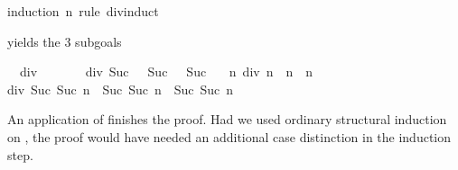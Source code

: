 \begin{isabellebody}
%
\isadelimproof
%
\endisadelimproof
%
\isatagproof
{}\isamarkupfalse%
{}induction\ n\ rule{}\ div{}{}induct{}%
\begin{isamarkuptxt}%
yields the 3 subgoals
\begin{isabelle}%
\ {}{}\ div{}\ {}{}\ {}\ {}{}\ {}\ {}\isanewline
\ {}{}\ div{}\ {}Suc\ {}\ {}\ Suc\ {}{}\ {}\ Suc\ {}\isanewline
\ {}{}\ {}n{}\ div{}\ {}n\ {}\ n{}\ {}\ n\ {}\isanewline
{}div{}\ {}Suc\ {}Suc\ n{}\ {}\ Suc\ {}Suc\ n{}{}\ {}\ Suc\ {}Suc\ n{}%
\end{isabelle}
An application of  finishes the proof.
Had we used ordinary structural induction on ,
the proof would have needed an additional
case distinction in the induction step.


\end{isamarkuptxt}
\end{isabellebody}
